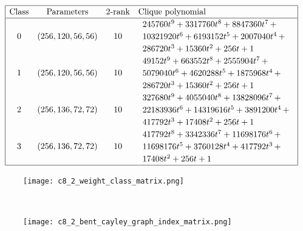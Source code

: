 \documentclass[12pt,a4paper]{article}
\begin{document}
\begin{table}[!bhpt] %
\small{}
\begin{align*}
\def\arraystretch{1.2}
\begin{array}{|cccl|}
\hline
\text{Class} &
\text{Parameters} &
\text{2-rank} &
\text{Clique polynomial}
\\
\hline
0 &
(256, 120, 56, 56) &
10 &
\begin{array}{l}
245760t^{9} + 3317760t^{8} + 8847360t^{7}
\,+
\\
 10321920t^{6} + 6193152t^{5} + 2007040t^{4}
\,+
\\
 286720t^{3} + 15360t^{2} + 256t + 1
\end{array}
\\
1 &
(256, 120, 56, 56) &
10 &
\begin{array}{l}
49152t^{9} + 663552t^{8} + 2555904t^{7}
\,+
\\
 5079040t^{6} + 4620288t^{5} + 1875968t^{4}
\,+
\\
 286720t^{3} + 15360t^{2} + 256t + 1
\end{array}
\\
2 &
(256, 136, 72, 72) &
10 &
\begin{array}{l}
327680t^{9} + 4055040t^{8} + 13828096t^{7}
\,+
\\
 22183936t^{6} + 14319616t^{5} + 3891200t^{4}
\,+
\\
 417792t^{3} + 17408t^{2} + 256t + 1
\end{array}
\\
3 &
(256, 136, 72, 72) &
10 &
\begin{array}{l}
417792t^{8} + 3342336t^{7} + 11698176t^{6}
\,+
\\
 11698176t^{5} + 3760128t^{4} + 417792t^{3}
\,+
\\
 17408t^{2} + 256t + 1
\end{array}
\\
\hline
\end{array}
\end{align*}
\caption{$[f_{8,2}]$ extended Cayley classes.}
\label{tab-c8_2_EC_classes}
\end{table}

\begin{figure}[!bhp] %
\centering
\begin{minipage}{.48\textwidth}
  \centering
  \texttt{[image: c8\_2\_weight\_class\_matrix.png]}
  \label{fig:c8_2_weight_class_matrix}
\end{minipage}%
~~~~
\begin{minipage}{.48\textwidth}
  \centering
  \texttt{[image: c8\_2\_bent\_cayley\_graph\_index\_matrix.png]}
  \label{fig:c8_2_bent_cayley_graph_index_matrix}
\end{minipage}
\end{figure}
~
%
\end{document}
